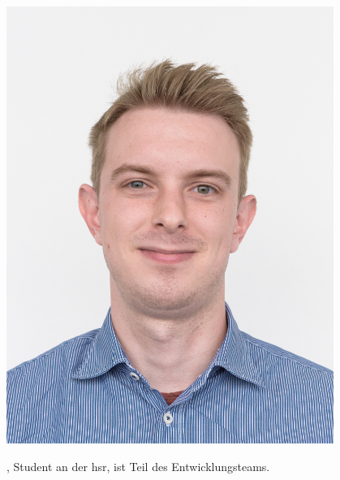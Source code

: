 \subsection{\sadf}

\begin{minipage}[t]{0.25\textwidth}
	\vspace{0pt}
	\includegraphics[width=0.8\textwidth]{img/silvan}
\end{minipage}
\begin{minipage}[t]{0.75\textwidth}
	\vspace{0pt}
	\sad, Student an der \gls{hsr}, ist Teil des Entwicklungsteams.
\end{minipage}

\subsection{\fbif}

